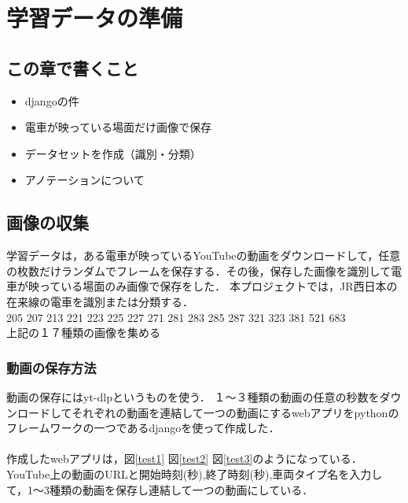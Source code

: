 

\chapter{学習データの準備}\label{genri}
\section{この章で書くこと}
\begin{itemize}
	\item djangoの件
	\item 電車が映っている場面だけ画像で保存
	\item データセットを作成（識別・分類）
	\item アノテーションについて
\end{itemize}

\section{画像の収集}
学習データは，ある電車が映っているYouTubeの動画をダウンロードして，任意の枚数だけランダムでフレームを保存する．その後，保存した画像を識別して電車が映っている場面のみ画像で保存をした．
本プロジェクトでは，JR西日本の在来線の電車を識別または分類する．\\
205  207  213  221  223  225  227  271  281  283  285  287  321  323  381  521  683 \\
上記の１７種類の画像を集める
\subsection{動画の保存方法}
動画の保存にはyt-dlpというものを使う．
１〜３種類の動画の任意の秒数をダウンロードしてそれぞれの動画を連結して一つの動画にするwebアプリをpythonのフレームワークの一つであるdjangoを使って作成した．\\
	\\
	作成したwebアプリは，図\ref{test1} 図\ref{test2}  図\ref{test3}のようになっている．
	YouTube上の動画のURLと開始時刻(秒),終了時刻(秒),車両タイプ名を入力して，1〜3種類の動画を保存し連結して一つの動画にしている．
	
